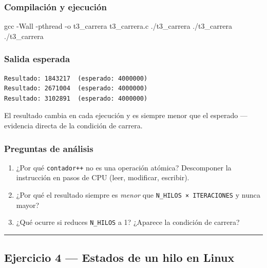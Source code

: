 \documentclass[
  spanish,
]{article}
\newenvironment{Shaded}{}{}
\newcommand{\AttributeTok}[1]{\textcolor[rgb]{0.49,0.56,0.16}{#1}}
\newcommand{\ExtensionTok}[1]{#1}
\newcommand{\FunctionTok}[1]{\textcolor[rgb]{0.02,0.16,0.49}{#1}}
\newcommand{\NormalTok}[1]{#1}
\providecommand{\tightlist}{%
  \setlength{\itemsep}{0pt}\setlength{\parskip}{0pt}}
\begin{document}
\subsubsection{Compilación y
ejecución}\label{compilaciuxf3n-y-ejecuciuxf3n-2}

\begin{Shaded}
\begin{Highlighting}[]
\FunctionTok{gcc} \AttributeTok{{-}Wall} \AttributeTok{{-}pthread} \AttributeTok{{-}o}\NormalTok{ t3\_carrera t3\_carrera.c}
\ExtensionTok{./t3\_carrera}
\ExtensionTok{./t3\_carrera}
\ExtensionTok{./t3\_carrera}
\end{Highlighting}
\end{Shaded}

\subsubsection{Salida esperada}\label{salida-esperada-2}

\begin{verbatim}
Resultado: 1843217  (esperado: 4000000)
Resultado: 2671004  (esperado: 4000000)
Resultado: 3102891  (esperado: 4000000)
\end{verbatim}

El resultado cambia en cada ejecución y es siempre menor que el esperado
--- evidencia directa de la condición de carrera.

\subsubsection{Preguntas de análisis}\label{preguntas-de-anuxe1lisis-2}

\begin{enumerate}
\def\labelenumi{\arabic{enumi}.}
\tightlist
\item
  ¿Por qué \texttt{contador++} no es una operación atómica? Descomponer
  la instrucción en pasos de CPU (leer, modificar, escribir).
\item
  ¿Por qué el resultado siempre es \emph{menor} que
  \texttt{N\_HILOS\ ×\ ITERACIONES} y nunca mayor?
\item
  ¿Qué ocurre si reduces \texttt{N\_HILOS} a 1? ¿Aparece la condición de
  carrera?
\end{enumerate}

\begin{center}\rule{0.5\linewidth}{0.5pt}\end{center}

\subsection{Ejercicio 4 --- Estados de un hilo en
Linux}\label{ejercicio-4-estados-de-un-hilo-en-linux}
\end{document}
